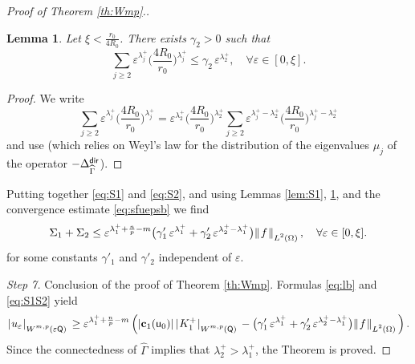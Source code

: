 \documentclass[titlepage,12pt]{amsart}
\newtheorem{lemma}[theorem]{Lemma}
\theoremstyle{definition}
\theoremstyle{remark}
\numberwithin{equation}{section}
\newcommand{\ee}{\hskip0.15ex}
\newcommand{\dd}[1]{_{\raise-0.6ex\hbox{$\scriptstyle #1$}}}
\newcommand {\Norm}[2]{ \mathchoice
    {|\ee #1\ee|\dd{#2}\,}
    {| #1 |_{#2}}
    {| #1 |_{#2}}
    {| #1 |_{#2}} }
\newcommand {\DNorm}[2]{ \mathchoice
    {\|\ee #1\ee\|\dd{#2}\,}
    {\| #1 \|_{#2}}
    {\| #1 \|_{#2}}
    {\| #1 \|_{#2}} }
\newcommand{\rQ}{{\mathsf{Q}}}
\newcommand{\sfu}{{\mathsf u}}
\begin{document}
\begin{proof}[Proof of Theorem \ref{th:Wmp}.]
\begin{lemma}
\label{lem:S2}
Let $\xi<\frac{r_0}{4R_0}$. There exists $\gamma_2>0$ such that 
\[
   \sum_{j\ge2}    \varepsilon^{\lambda^+_j} 
   \Big(\frac{4R_0}{r_0} \Big)^{\lambda^+_j} \le 
   \gamma_2\, \varepsilon^{\lambda^+_2},\quad \forall\varepsilon\in[0,\xi].
\]
\end{lemma}

\begin{proof}
We write
\[
   \sum_{j\ge2}    \varepsilon^{\lambda^+_j} 
   \Big(\frac{4R_0}{r_0} \Big)^{\lambda^+_j} =
   \varepsilon^{\lambda^+_2} \Big(\frac{4R_0}{r_0} \Big)^{\lambda^+_2}
   \sum_{j\ge2}  \varepsilon^{\lambda^+_j-\lambda^+_2} 
   \Big(\frac{4R_0}{r_0} \Big)^{\lambda^+_j-\lambda^+_2}   
\]
and use \cite[Lemma\,4.14]{CoDa2Mu:2024} (which relies on Weyl's law for the distribution of the eigenvalues $\mu_j$ of the operator $-\Delta^{\sf dir}_{\widehat\Gamma}$).
\end{proof}

Putting together \eqref{eq:S1} and \eqref{eq:S2}, and using Lemmas \ref{lem:S1}, \ref{lem:S2}, and the convergence estimate \eqref{eq:sfuepsb} we find
\begin{equation}
\label{eq:S1S2}
    \Sigma_1+\Sigma_2 \le \varepsilon^{\lambda^+_1+\frac{n}{p}-m}
   \big(\gamma'_1\,\varepsilon^{\lambda^+_1} + 
   \gamma'_2\, \varepsilon^{\lambda^+_2-\lambda^+_1}\big){\DNorm{f}{L^2(\Omega)}},
   \quad \forall\varepsilon\in[0,\xi].
\end{equation}
for some constants $\gamma'_1$ and $\gamma'_2$ independent of $\varepsilon$.

{\em Step 7.} Conclusion of the proof of Theorem \ref{th:Wmp}. Formulas \eqref{eq:lb} and \eqref{eq:S1S2} yield
\begin{equation*}
   \Norm{u_\varepsilon}{W^{m,p}(\varepsilon\rQ)} \ge 
   \varepsilon^{\lambda^+_1+\frac{n}{p}-m} \left( 
   |\mathbf{c}_1(\sfu_0)|\, \Norm{K^+_1}{W^{m,p}(\rQ)}
   - \big(\gamma'_1\,\varepsilon^{\lambda^+_1} + 
   \gamma'_2\, \varepsilon^{\lambda^+_2-\lambda^+_1}\big){\DNorm{f}{L^2(\Omega)}}
   \right).
\end{equation*}
Since the connectedness of $\widehat\Gamma$ implies that $\lambda^+_2>\lambda^+_1$, the Theorem is proved.
\end{proof}
\end{document}
